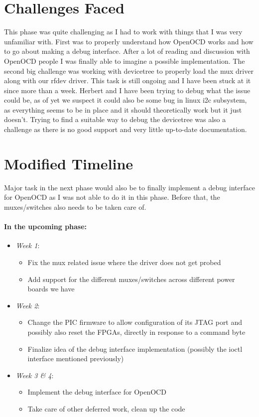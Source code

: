 \documentclass{article}
\begin{document}
\section{Challenges Faced}
This phase was quite challenging as I had to work with things that I was very
unfamiliar with. First was to properly understand how OpenOCD works and how to
go about making a debug interface. After a lot of reading and discussion with OpenOCD
people I was finally able to imagine a possible implementation. The second big
challenge was working with devicetree to properly load the mux driver along
with our rfdev driver. This task is still ongoing and I have been stuck at it since
more than a week. Herbert and I have been trying to debug what the issue could be,
as of yet we suspect it could also be some bug in linux i2c subsystem, as everything
seems to be in place and it should theoretically work but it just doesn't. Trying
to find a suitable way to debug the devicetree was also a challenge as there is
no good support and very little up-to-date documentation.

\section{Modified Timeline}
Major task in the next phase would also be to finally implement a debug interface
for OpenOCD as I was not able to do it in this phase. Before that, the muxes/switches
also needs to be taken care of.

\newpage

\paragraph{In the upcoming phase:}
\begin{itemize}
\item \emph{Week 1}:
	\begin{itemize}
	\item Fix the mux related issue where the driver does not get probed
	\item Add support for the different
		muxes/switches across different power boards we have
	\end{itemize}
\item \emph{Week 2}:
	\begin{itemize}
	\item Change the PIC firmware to allow configuration of its JTAG port and
		possibly also reset the FPGAs, directly in response to a command byte
	\item Finalize idea of the debug interface implementation
		(possibly the ioctl interface mentioned previously)
	\end{itemize}
\item \emph{Week 3 \& 4}: 
	\begin{itemize}
	\item Implement the debug interface for OpenOCD
	\item Take care of other deferred work, clean up the code
	\end{itemize}
\end{itemize}
\end{document}

